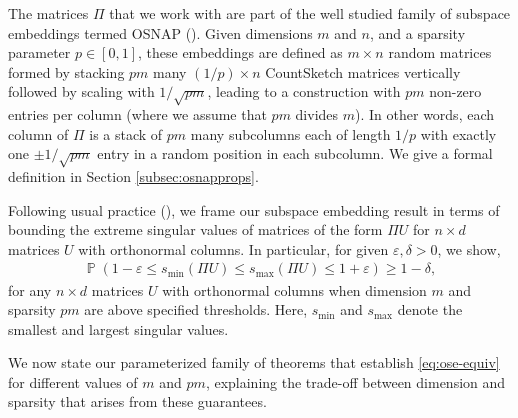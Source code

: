 \documentclass[11pt]{amsart}
\numberwithin{equation}{section}
\numberwithin{equation}{section}
\DeclareMathOperator{\Pb}{\mathbb{P}}
\begin{document}
The matrices $\Pi$ that we work with are part of the well studied family of subspace embeddings termed OSNAP (\cite{nelson2013osnap, chenakkod2025optimal}). Given dimensions $m$ and $n$, and a sparsity parameter $p\in[0,1]$, these embeddings are defined as $m \times n$ random matrices formed by stacking $pm$ many $(1/p) \times n$ CountSketch matrices vertically followed by scaling with $1/\sqrt{pm}$, leading to a construction with $pm$ non-zero entries per column (where we assume that $pm$ divides $m$). In other words, each column of $\Pi$ is a stack of $pm$ many subcolumns each of length $1/p$ with exactly one $\pm 1/\sqrt{pm}$ entry in a random position in each subcolumn. We give a formal definition in Section \ref{subsec:osnapprops}. 

Following usual practice (\cite{nelson2013osnap, cohen2016nearly, chenakkod2024optimal, chenakkod2025optimal}), we frame our subspace embedding result in terms of bounding the extreme singular values of matrices of the form $\Pi U$ for $n \times d$ matrices $U$ with orthonormal columns. In particular, for given $\varepsilon, \delta > 0$, we show, 
\begin{align}
\Pb(1-\varepsilon\leq s_{\min}(\Pi U)\leq s_{\max}(\Pi U)\leq 1+\varepsilon)\geq 1-\delta,\label{eq:ose-equiv}
 \end{align}
 for any $n \times d$ matrices $U$ with orthonormal columns when dimension $m$ and sparsity $pm$ are above specified thresholds. Here, $s_{\min}$ and $s_{\max}$ denote the smallest and largest singular values.

 We now state our parameterized family of theorems that establish \eqref{eq:ose-equiv} for different values of $m$ and $pm$, explaining the trade-off between dimension and sparsity that arises from these guarantees.
 
\end{document}
